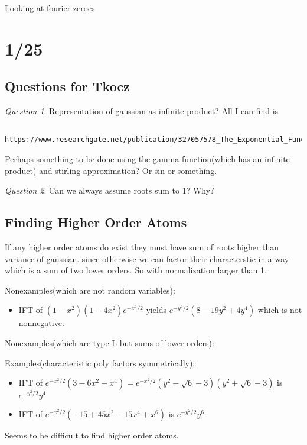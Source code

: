 \documentclass[11pt]{article}
\theoremstyle{remark}
\newtheorem*{quest}{Question}
\begin{document}
Looking at fourier zeroes

\section{1/25}

\subsection{Questions for Tkocz}

\begin{quest}
	Representation of gaussian as infinite product? All I can find is 
	\begin{verbatim}
		https://www.researchgate.net/publication/327057578_The_Exponential_Function_and_its_Infinite_Product
	\end{verbatim}

	Perhaps something to be done using the gamma function(which has an infinite product) and stirling approximation? Or sin or something.
\end{quest}

\begin{quest}
	Can we always assume roots sum to 1? Why?
\end{quest}

\subsection{Finding Higher Order Atoms}

\begin{remark}
	If any higher order atoms do exist they must have sum of roots higher than variance of gaussian. since otherwise we can factor their characterstic in a way which is a sum of two lower orders. So with normalization larger than 1.
\end{remark}

\begin{remark}
	Nonexamples(which are not random variables):
	\begin{itemize}
		\item IFT of $(1-x^2)(1-4x^2)e^{-x^2/2}$ yields $e^{-y^2/2}(8-19y^2 +4y^4)$ which is not nonnegative.
	\end{itemize}

	Nonexamples(which are type L but sums of lower orders):
	\begin{itemize}

	\end{itemize}

	Examples(characteristic poly factors symmetrically):
	\begin{itemize}
		\item IFT of $e^{-x^2/2}(3-6x^2+x^4) = e^{-x^2/2}(y^2-\sqrt{6}-3)(y^2+\sqrt{6}-3)$ is $e^{-y^2/2}y^4$
		\item IFT of $e^{-x^2/2}(-15 + 45 x^2 - 15 x^4 + x^6)$ is $e^{-y^2/2}y^6$ 
	\end{itemize}

	Seems to be difficult to find higher order atoms.
\end{remark}
\end{document}
